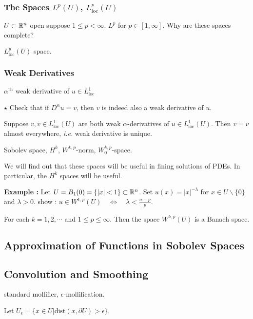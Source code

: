 \documentclass[10pt,a4paper]{report}
\begin{document}
\subsubsection*{The Spaces $L^p(U)$, $L^p_{\text{loc}}(U)$}

$U\subset\mathbb{R}^n$ open suppose $1\leq p<\infty$. $L^{p}$ for $p\in [1, \infty]$. Why are these spaces complete?

\quad $L^p_{\text{loc}}(U)$ space.

\subsubsection*{Weak Derivatives}

 $\alpha^{\text{th}}$ weak derivative of $u \in L^1_{\text{loc}}$
\s

$\star$ Check that if $D^{\alpha} u = v$, then $v$ is indeed also a weak derivative of $u$.
\s

\lem Suppose $v,\tilde{v} \in L^1_{\text{loc}} (U)$ are both weak $\alpha$-derivatives of $u\in L^1_{\text{loc}} (U)$. Then $v= \tilde{v}$ almost everywhere, \textit{i.e.} weak derivative is unique.

\s
{} Sobolev space, $H^k$, $W^{k,p}$-norm, $W_0^{k,p}$-space.
\s

We will find out that these spaces will be useful in fining solutions of PDEs. In particular, the $H^k$ spaces will be useful.
\s

\textbf{Example :} Let $U = B_1(0) = \{ |x| <1 \} \subset \mathbb{R}^n$. Set $u(x) = |x|^{-\lambda}$ for $x\in U \backslash \{0\}$ and $\lambda >0$. show : $u\in W^{1,p}(U) \quad \Leftrightarrow \quad \lambda < \frac{n-p}{p}$.
\s

\thm  For each $k=1,2,\cdots$ and $1\leq p\leq \infty$. Then the space $W^{k,p}(U)$ is a Banach space.

\subsection*{Approximation of Functions in Sobolev Spaces}

\subsection*{Convolution and Smoothing}

 standard mollifier, $\epsilon$-mollification.

\quad Let $U_{\epsilon} = \{ x\in U | \text{dist}(x,\partial U) > \epsilon \}$.
\s
\end{document}
